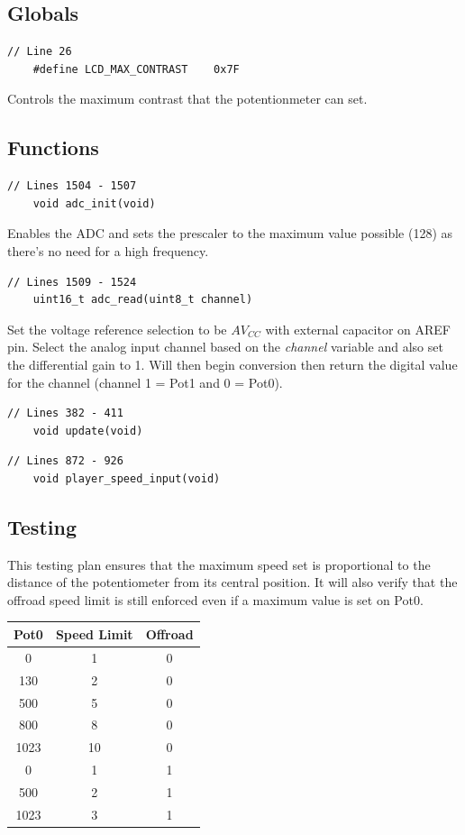\documentclass{article}
\begin{document}
\subsection*{Globals}
\begin{lstlisting}[style=CStyle]
	// Line 26
	#define LCD_MAX_CONTRAST    0x7F
\end{lstlisting}
Controls the maximum contrast that the potentionmeter can set.
\newline

\subsection*{Functions}
\begin{lstlisting}[style=CStyle]
	// Lines 1504 - 1507
	void adc_init(void)
\end{lstlisting}
Enables the ADC and sets the prescaler to the maximum value possible (128) as there's no need for a high frequency. 
\begin{lstlisting}[style=CStyle]
	// Lines 1509 - 1524
	uint16_t adc_read(uint8_t channel)
\end{lstlisting}
Set the voltage reference selection to be \(AV_{CC}\) with external capacitor on AREF pin. Select the analog input channel based on the \emph{channel} variable and also set the differential gain to 1. Will then begin conversion then return the digital value for the channel (channel 1 = Pot1 and 0 = Pot0).
\begin{lstlisting}[style=CStyle]
	// Lines 382 - 411
	void update(void)
\end{lstlisting}

\begin{lstlisting}[style=CStyle]
	// Lines 872 - 926
	void player_speed_input(void)
\end{lstlisting}

\subsection*{Testing}
This testing plan ensures that the maximum speed set is proportional to the distance of the potentiometer from its central position. It will also verify that the offroad speed limit is still enforced even if a maximum value is set on Pot0.
\begin{center}
\begin{tabular}{ c c c }
Pot0	& Speed Limit	& Offroad	\\ \hline
0	& 1			& 0		\\
130	& 2			& 0		\\
500 	& 5			& 0		\\
800	& 8			& 0		\\
1023	& 10			& 0		\\
0	& 1			& 1		\\
500	& 2			& 1		\\
1023	& 3			& 1		\\ \hline
\end{tabular}
\end{center}
\end{document}
